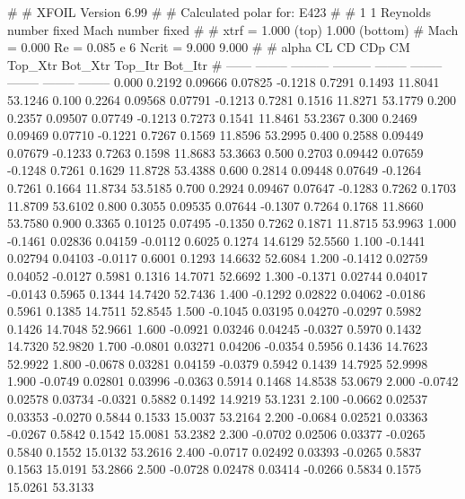 #  
#       XFOIL         Version 6.99
#  
# Calculated polar for: E423                                            
#  
# 1 1 Reynolds number fixed          Mach number fixed         
#  
# xtrf =   1.000 (top)        1.000 (bottom)  
# Mach =   0.000     Re =     0.085 e 6     Ncrit =   9.000  9.000
#  
#   alpha    CL        CD       CDp       CM     Top_Xtr  Bot_Xtr  Top_Itr  Bot_Itr
#  ------ -------- --------- --------- -------- -------- -------- -------- --------
   0.000   0.2192   0.09666   0.07825  -0.1218   0.7291   0.1493  11.8041  53.1246
   0.100   0.2264   0.09568   0.07791  -0.1213   0.7281   0.1516  11.8271  53.1779
   0.200   0.2357   0.09507   0.07749  -0.1213   0.7273   0.1541  11.8461  53.2367
   0.300   0.2469   0.09469   0.07710  -0.1221   0.7267   0.1569  11.8596  53.2995
   0.400   0.2588   0.09449   0.07679  -0.1233   0.7263   0.1598  11.8683  53.3663
   0.500   0.2703   0.09442   0.07659  -0.1248   0.7261   0.1629  11.8728  53.4388
   0.600   0.2814   0.09448   0.07649  -0.1264   0.7261   0.1664  11.8734  53.5185
   0.700   0.2924   0.09467   0.07647  -0.1283   0.7262   0.1703  11.8709  53.6102
   0.800   0.3055   0.09535   0.07644  -0.1307   0.7264   0.1768  11.8660  53.7580
   0.900   0.3365   0.10125   0.07495  -0.1350   0.7262   0.1871  11.8715  53.9963
   1.000  -0.1461   0.02836   0.04159  -0.0112   0.6025   0.1274  14.6129  52.5560
   1.100  -0.1441   0.02794   0.04103  -0.0117   0.6001   0.1293  14.6632  52.6084
   1.200  -0.1412   0.02759   0.04052  -0.0127   0.5981   0.1316  14.7071  52.6692
   1.300  -0.1371   0.02744   0.04017  -0.0143   0.5965   0.1344  14.7420  52.7436
   1.400  -0.1292   0.02822   0.04062  -0.0186   0.5961   0.1385  14.7511  52.8545
   1.500  -0.1045   0.03195   0.04270  -0.0297   0.5982   0.1426  14.7048  52.9661
   1.600  -0.0921   0.03246   0.04245  -0.0327   0.5970   0.1432  14.7320  52.9820
   1.700  -0.0801   0.03271   0.04206  -0.0354   0.5956   0.1436  14.7623  52.9922
   1.800  -0.0678   0.03281   0.04159  -0.0379   0.5942   0.1439  14.7925  52.9998
   1.900  -0.0749   0.02801   0.03996  -0.0363   0.5914   0.1468  14.8538  53.0679
   2.000  -0.0742   0.02578   0.03734  -0.0321   0.5882   0.1492  14.9219  53.1231
   2.100  -0.0662   0.02537   0.03353  -0.0270   0.5844   0.1533  15.0037  53.2164
   2.200  -0.0684   0.02521   0.03363  -0.0267   0.5842   0.1542  15.0081  53.2382
   2.300  -0.0702   0.02506   0.03377  -0.0265   0.5840   0.1552  15.0132  53.2616
   2.400  -0.0717   0.02492   0.03393  -0.0265   0.5837   0.1563  15.0191  53.2866
   2.500  -0.0728   0.02478   0.03414  -0.0266   0.5834   0.1575  15.0261  53.3133
